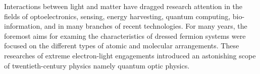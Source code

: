 Interactions between light and matter have dragged research attention in the fields of optoelectronics, sensing, energy harvesting, quantum computing, bio-information, and in many branches of recent technologies. For many years, the foremost aims for examing the characteristics of dressed fermion systems were focused on the different types of atomic and molecular arrangements. These researches of extreme electron-light engagements introduced an astonishing scope of twentieth-century physics namely quantum optic physics.
